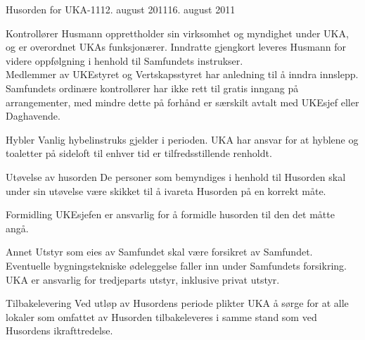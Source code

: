 \documentclass[../fsbok.tex]{subfiles}
\begin{document}
\begin{instruks}{Husorden for UKA-11}{12. august 2011}{16. august 2011}
\begin{instruksledd}{Kontrollører}
Husmann opprettholder sin virksomhet og myndighet under UKA, og er
overordnet UKAs funksjonærer. Inndratte gjengkort leveres Husmann for videre
oppfølgning i henhold til Samfundets instrukser.\\

Medlemmer av UKEstyret og Vertskapsstyret har anledning til å inndra innslepp.
Samfundets ordinære kontrollører har ikke rett til gratis inngang på
arrangementer, med mindre dette på forhånd er særskilt avtalt med UKEsjef eller
Daghavende.\\
\end{instruksledd}

\begin{instruksledd}{Hybler}
Vanlig hybelinstruks gjelder i perioden. UKA har ansvar for at hyblene og
toaletter på sideloft til enhver tid er tilfredsstillende renholdt.
\end{instruksledd}

\begin{instruksledd}{Utøvelse av husorden}
De personer som bemyndiges i henhold til Husorden skal under sin utøvelse
være skikket til å ivareta Husorden på en korrekt måte.
\end{instruksledd}

\begin{instruksledd}{Formidling}
UKEsjefen er ansvarlig for å formidle husorden til den det måtte angå.
\end{instruksledd}

\begin{instruksledd}{Annet}
Utstyr som eies av Samfundet skal være forsikret av Samfundet. Eventuelle
bygningstekniske ødeleggelse faller inn under Samfundets forsikring. UKA er
ansvarlig for tredjeparts utstyr, inklusive privat utstyr.
\end{instruksledd}

\begin{instruksledd}{Tilbakelevering}
Ved utløp av Husordens periode plikter UKA å sørge for at alle lokaler som
omfattet av Husorden tilbakeleveres i samme stand som ved Husordens
ikrafttredelse.
\end{instruksledd}

\end{instruks}
\end{document}

